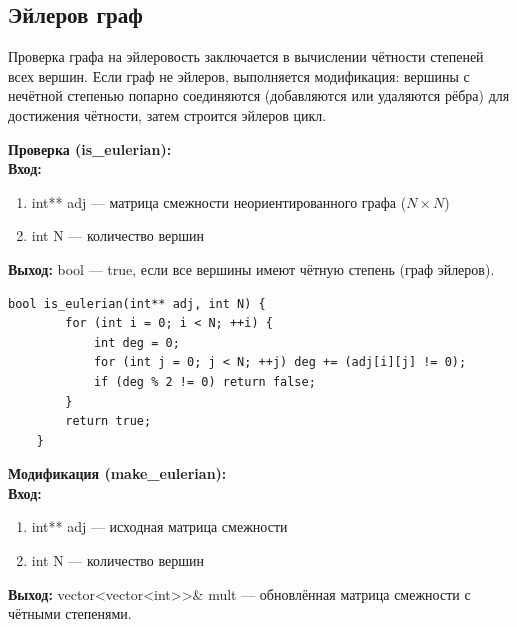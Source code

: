 \subsection{Эйлеров граф}
Проверка графа на эйлеровость заключается в вычислении чётности степеней всех вершин. Если граф не эйлеров, выполняется модификация: вершины с нечётной степенью попарно соединяются (добавляются или удаляются рёбра) для достижения чётности, затем строится эйлеров цикл.

\noindent\textbf{Проверка (is\_eulerian):} \\
\noindent\textbf{Вход:}
\begin{enumerate}
	\item int** adj — матрица смежности неориентированного графа ($N \times N$)
	\item int N — количество вершин
\end{enumerate}
\noindent\textbf{Выход:}
bool — true, если все вершины имеют чётную степень (граф эйлеров).

\begin{lstlisting}[caption=Проверка на эйлеровость (euler.cpp)]
	bool is_eulerian(int** adj, int N) {
		for (int i = 0; i < N; ++i) {
			int deg = 0;
			for (int j = 0; j < N; ++j) deg += (adj[i][j] != 0);
			if (deg % 2 != 0) return false;
		}
		return true;
	}
\end{lstlisting}

\vspace*{20pt}

\noindent\textbf{Модификация (make\_eulerian):} \\
\noindent\textbf{Вход:}
\begin{enumerate}
	\item int** adj — исходная матрица смежности
	\item int N — количество вершин
\end{enumerate}
\noindent\textbf{Выход:}
vector<vector<int>>\& mult — обновлённая матрица смежности с чётными степенями.

